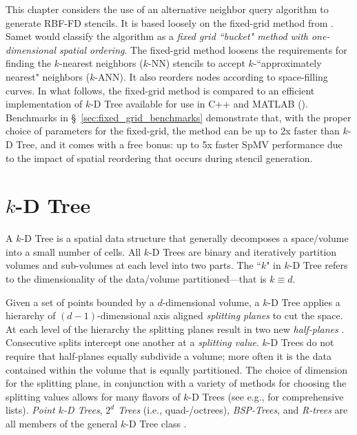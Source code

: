 \documentclass{report}
\begin{document}
This chapter considers the use of an alternative neighbor query algorithm to generate RBF-FD stencils. It is based loosely on the fixed-grid method from \cite{Krog2010,Green2010,Johnson2011}. Samet\cite{Samet2005} would classify the algorithm as a \emph{fixed grid ``bucket" method with one-dimensional spatial ordering}. The fixed-grid method loosens the requirements for finding the $k$-nearest neighbors ($k$-NN) stencils to accept $k$-``approximately nearest" neighbors ($k$-ANN). It also reorders nodes according to space-filling curves. In what follows, the fixed-grid method is compared to an efficient implementation of $k$-D Tree available for use in C++ and MATLAB (\cite{TagliasacchiMFE}). Benchmarks in \S~\ref{sec:fixed_grid_benchmarks} demonstrate that, with the proper choice of parameters for the fixed-grid, the method can be up to 2x faster than $k$-D Tree, and it comes with a free bonus: up to 5x faster SpMV performance due to the impact of spatial reordering that occurs during stencil generation. 


\section{$k$-D Tree}

A $k$-D Tree is a spatial data structure that generally decomposes a space/volume into a small number of cells. All $k$-D Trees are binary and iteratively partition volumes and sub-volumes at each level into two parts. The ``$k$" in $k$-D Tree refers to the dimensionality of the data/volume  partitioned---that is $k \equiv d$. 


Given a set of points bounded by a $d$-dimensional volume, a $k$-D Tree applies a hierarchy of $(d-1)$-dimensional axis aligned \emph{splitting planes} to cut the space. At each level of the hierarchy the splitting planes result in two new \emph{half-planes} \cite{Skiena2008}. Consecutive splits intercept one another at a \emph{splitting value}. $k$-D Trees do not require that half-planes equally subdivide a volume; more often it is the data contained within the volume that is equally partitioned. The choice of dimension for the splitting plane, in conjunction with a variety of methods for choosing the splitting values allows for many flavors of $k$-D Trees (see e.g., \cite{Samet2005, Skiena2008, Berg2008} for comprehensive lists). \emph{Point $k$-D Trees}, \emph{$2^d$ Trees} (i.e., quad-/octrees), \emph{BSP-Trees}, and \emph{R-trees} are all members of the general $k$-D Tree class \cite{Skiena2008,Ying2006}.
\end{document}
